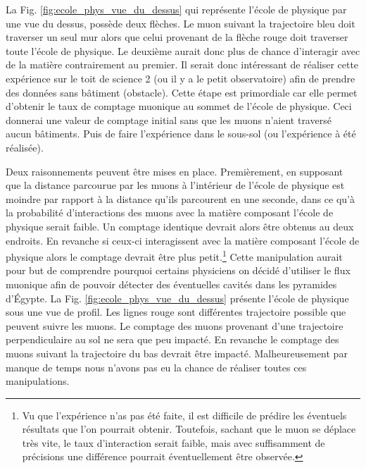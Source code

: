 \documentclass[12pt]{article}
\begin{document}
La Fig. \ref{fig:ecole_phys_vue_du_dessus} qui représente l'école de physique par une vue du dessus, possède deux flèches. Le muon suivant la trajectoire bleu doit traverser un seul mur alors que celui provenant de la flèche rouge doit traverser toute l'école de physique. Le deuxième aurait donc plus de chance d'interagir avec de la matière contrairement au premier. Il serait donc intéressant de réaliser cette expérience sur le toit de science 2 (ou il y a le petit observatoire) afin de prendre des données sans bâtiment (obstacle). Cette étape est primordiale car elle permet d'obtenir le taux de comptage muonique au sommet de l'école de physique. Ceci  donnerai une valeur de comptage initial sans que les muons n'aient traversé aucun bâtiments. Puis de faire l'expérience dans le sous-sol (ou l'expérience à été réalisée).

Deux raisonnements peuvent être mises en place.
Premièrement, en supposant que la distance parcourue par les muons à l'intérieur de l'école de physique est moindre par rapport à la distance qu'ils parcourent en une seconde, dans ce qu'à la probabilité d'interactions des muons avec la matière composant l'école de physique serait faible. Un comptage identique devrait alors être obtenus au deux endroits.
En revanche si ceux-ci interagissent avec la matière composant l'école de physique alors le comptage devrait être plus petit.\footnote{Vu que l'expérience n'as pas été faite, il est difficile de prédire les éventuels résultats que l'on pourrait obtenir. Toutefois, sachant que le muon se déplace très vite, le taux d'interaction serait faible, mais avec suffisamment de précisions une différence pourrait éventuellement 
être observée.} Cette manipulation aurait pour but de comprendre pourquoi certains physiciens on décidé d'utiliser le flux muonique afin de pouvoir détecter des éventuelles cavités dans les pyramides d'Égypte. La Fig. \ref{fig:ecole_phys_vue_du_dessus} présente l'école de physique sous une vue de profil. Les lignes rouge sont différentes trajectoire possible que peuvent suivre les muons. Le comptage des muons provenant d'une trajectoire perpendiculaire au sol ne sera que peu impacté. En revanche le comptage des muons suivant la trajectoire du bas devrait être impacté. Malheureusement par manque de temps nous n'avons pas eu la chance de réaliser toutes ces manipulations.


\end{document}
